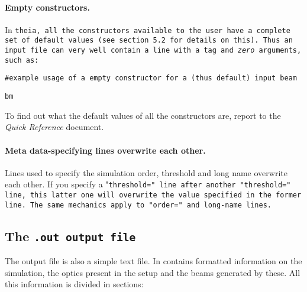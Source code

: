\documentclass{article}
\begin{document}



\paragraph{Empty constructors.}In \tt{theia}, all the constructors available to the user have a complete set of default values (see section 5.2 for details on this). Thus an input file can very well contain a line with a tag and \textit{zero} arguments, such as:

\tt{\#example usage of a empty constructor for a (thus default) input beam}

\tt{bm}


To find out what the default values of all the constructors are, report to the \textit{Quick Reference} document.


\paragraph{Meta data-specifying lines overwrite each other.}Lines used to specify the simulation order, threshold and long name overwrite each other. If you specify a "\tt{threshold=}" line after another "\tt{threshold=}" line, this latter one will overwrite the value specified in the former line. The same mechanics apply to "\tt{order=}" and long-name lines.

\subsection{The \tt{.out} output file}
The output file is also a simple text file. In contains formatted information on the simulation, the optics present in the setup and the beams generated by these. All this information is divided in sections:
\end{document}
